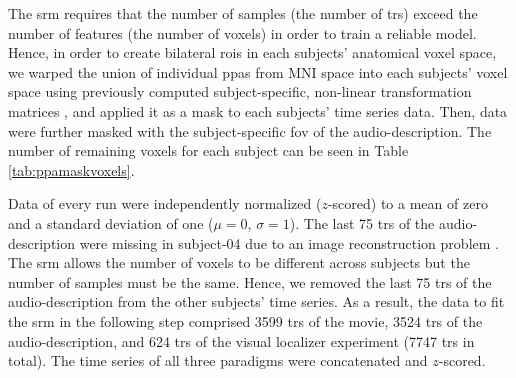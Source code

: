 


The \ac{srm} requires that the number of samples (the number of \acp{tr}) exceed
the number of features (the number of voxels) in order to train a reliable
model.
Hence, in order to create bilateral \acp{roi} in each subjects' anatomical voxel
space, we warped the union of individual \acp{ppa}
\citep[s.][]{haeusler2022processing} from MNI space into each subjects' voxel
space using previously computed subject-specific, non-linear transformation
matrices
\citep[][\href{https://github.com/psychoinformatics-de/studyforrest-data-templatetransforms
}{\url{github.com/psychoinformatics-de/studyforrest-data-templatetransforms}}]{hanke2014audiomovie},
and applied it as a mask to each subjects' time series data.
Then, data were further masked with the subject-specific \ac{fov} of the
audio-description.
%
The number of remaining voxels for each subject can be seen in Table
\ref{tab:ppamaskvoxels}.






Data of every run were independently normalized ($z$-scored) to a mean of zero
and a standard deviation of one ($\mu=0$, $\sigma=1$).
%
The last 75 \acp{tr} of the audio-description were missing in subject-04 due to
an image reconstruction problem \citep[s.][]{hanke2014audiomovie}.
%
The \ac{srm} allows the number of voxels to be different across subjects but the
number of samples must be the same.
%
Hence, we removed the last 75 \acp{tr} of the audio-description from the other
subjects' time series.
As a result, the data to fit the \ac{srm} in the following step comprised 3599
\acp{tr} of the movie, 3524 \acp{tr} of the audio-description, and 624 \acp{tr}
of the visual localizer experiment (7747 \acp{tr} in total).
The time series of all three paradigms were concatenated and $z$-scored.

